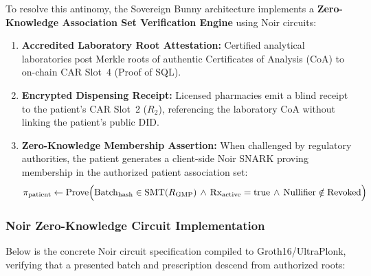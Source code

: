 \documentclass[a4paper,11pt,twoside,parskip=half-,headings=small]{scrartcl}
\begin{document}
To resolve this antinomy, the Sovereign Bunny architecture implements a \textbf{Zero-Knowledge Association Set Verification Engine} using Noir circuits:
\begin{enumerate}[nosep]
  \item \textbf{Accredited Laboratory Root Attestation:} Certified analytical laboratories post Merkle roots of authentic Certificates of Analysis (CoA) to on-chain CAR Slot~4 (Proof of SQL).
  \item \textbf{Encrypted Dispensing Receipt:} Licensed pharmacies emit a blind receipt to the patient's CAR Slot~2 ($R_2$), referencing the laboratory CoA without linking the patient's public DID.
  \item \textbf{Zero-Knowledge Membership Assertion:} When challenged by regulatory authorities, the patient generates a client-side Noir SNARK proving membership in the authorized patient association set:
  \begin{equation}
    \pi_{\text{patient}} \leftarrow \operatorname{Prove}\Bigl(\operatorname{Batch}_{\text{hash}} \in \operatorname{SMT}(R_{\text{GMP}}) \,\land\, \operatorname{Rx}_{\text{active}} = \text{true} \,\land\, \text{Nullifier} \notin \text{Revoked}\Bigr)
  \end{equation}
\end{enumerate}

\subsubsection{Noir Zero-Knowledge Circuit Implementation}

Below is the concrete Noir circuit specification compiled to Groth16/UltraPlonk, verifying that a presented batch and prescription descend from authorized roots:
\end{document}
